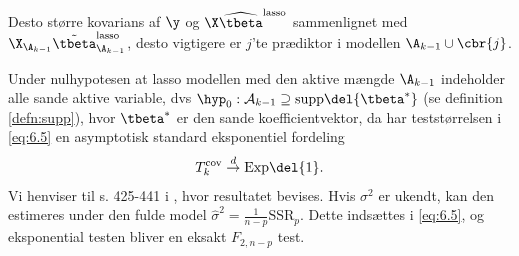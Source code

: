 Desto større kovarians af \(\y\) og \(\X \widehat{\tbeta}^\text{lasso}\) sammenlignet med \(\X_{\A_{k-1}} \tilde{\tbeta}^\text{lasso}_{\A_{k-1}}\), desto vigtigere er \(j\)'te prædiktor i modellen \(\A_{k-1} \cup \cbr{j}\).

Under nulhypotesen at lasso modellen med den aktive mængde \(\A_{k-1}\) indeholder alle sande aktive variable, dvs \(\hyp_0: \mathcal{A}_{k-1} \supseteq \text{supp} \del{\tbeta^*}\) (se definition \ref{defn:supp}), hvor \(\tbeta^*\) er den sande koefficientvektor, da har teststørrelsen i \eqref{eq:6.5} en asymptotisk standard eksponentiel fordeling
\begin{align*}
T_k^\text{cov} \overset{d}{\rightarrow} \text{Exp}\del{1}.
\end{align*}
Vi henviser til s. 425-441 i \citep{lockhart}, hvor resultatet bevises. 
Hvis \(\sigma^2\) er ukendt, kan den estimeres under den fulde model \(\widehat{\sigma}^2 = \frac{1}{n-p} \text{SSR}_p\). 
Dette indsættes i \eqref{eq:6.5}, og eksponential testen bliver en eksakt \(F_{2,n-p}\) test. \\[2mm]

